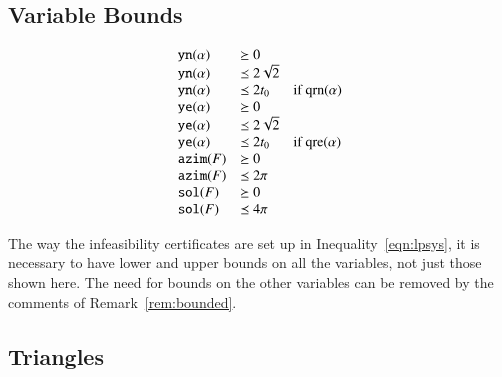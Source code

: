 \subsection{Variable Bounds}
\begin{equation}
    \begin{array}{lll}
        {\operatorname{{\texttt{yn}}}}(\alpha) &\succeq0\\
        {\operatorname{{\texttt{yn}}}}(\alpha) &\preceq 2\sqrt2\\
        {\operatorname{{\texttt{yn}}}}(\alpha) &\preceq 2t_0 &\text{if }
        {\operatorname{qrn}}(\alpha)\\
        {\operatorname{{\texttt{ye}}}}(\alpha)&\succeq0\\
        {\operatorname{{\texttt{ye}}}}(\alpha)&\preceq 2\sqrt2\\
        {\operatorname{{\texttt{ye}}}}(\alpha)&\preceq 2t_0&\text{if }
        {\operatorname{qre}}(\alpha)\\
        {\operatorname{{\texttt{azim}}}}(F) &\succeq 0\\
        {\operatorname{{\texttt{azim}}}}(F) &\preceq 2\pi\\
        {\operatorname{{\texttt{sol}}}}(F) &\succeq 0\\
        {\operatorname{{\texttt{sol}}}}(F) &\preceq 4\pi\\
    \end{array}
\end{equation}





\begin{remark}
The way the infeasibility certificates are set up in
Inequality~\ref{eqn:lpsys}, it is necessary to have lower and
upper bounds on all the variables, not just those shown here.  The
need for bounds on the other variables can be removed by the
comments of Remark~\ref{rem:bounded}.
\end{remark}




\subsection{Triangles}

